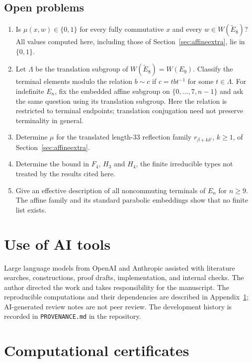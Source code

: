\documentclass[10pt]{article}
\theoremstyle{remark}
\begin{document}
\subsection{Open problems}
\begin{enumerate}
\item Is $\mu(x,w)\in\{0,1\}$ for every fully commutative $x$ and every
$w\in W(\widetilde E_8)$? All values computed here, including those of
Section~\ref{sec:affineextra}, lie in $\{0,1\}$.
\item Let $\Lambda$ be the translation subgroup of
$W(\widetilde E_8)=W(E_9)$. Classify the terminal elements modulo the
relation $b\sim c$ if $c=tbt^{-1}$ for some $t\in\Lambda$.
For indefinite $E_n$, fix the embedded affine subgroup on
$\{0,\ldots,7,n-1\}$ and ask the same question using its translation
subgroup. Here the relation is restricted to terminal endpoints;
translation conjugation need not preserve terminality in general.
\item Determine $\mu$ for the translated length-$33$ reflection family
$r_{\beta+k\delta'}$, $k\geq1$, of Section~\ref{sec:affineextra}.
\item Determine the bound in $F_4$, $H_3$ and $H_4$, the finite irreducible
types not treated by the results cited here.
\item Give an effective description of all noncommuting terminals of
$E_n$ for $n\geq9$. The affine family and its standard parabolic embeddings
show that no finite list exists.
\end{enumerate}

\section*{Use of AI tools}
Large language models from OpenAI and Anthropic assisted with literature
searches, constructions, proof drafts, implementation, and internal
checks. The author directed the work and takes responsibility for the
manuscript. The reproducible computations and their dependencies are
described in Appendix~\ref{app:certificates}; AI-generated review notes
are not peer review. The development history is recorded in
\texttt{PROVENANCE.md} in the repository.

\appendix
\section{Computational certificates}\label{app:certificates}
\end{document}
